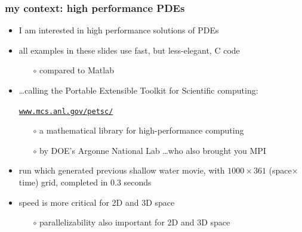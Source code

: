 \documentclass[10pt,dvipsnames,usepdftitle=false,
hyperref={pdftitle = {Finite volume methods},
    pdfauthor = {Ed Bueler}}]{beamer}
\begin{document}
\begin{frame}[fragile]

\frametitle{my context: high performance PDEs}

\begin{itemize}
\item I am interested in high performance solutions of PDEs
\item all examples in these slides use fast, but less-elegant, C code
    \begin{itemize}
    \item[$\circ$] compared to Matlab
    \end{itemize}
\item \dots calling the Portable Extensible Toolkit for Scientific computing:

    \begin{center}
    \href{https://www.mcs.anl.gov/petsc/}{\texttt{www.mcs.anl.gov/petsc/}}
    \end{center}

    \begin{itemize}
    \item[$\circ$] a mathematical library for high-performance computing
    \item[$\circ$] by DOE's Argonne National Lab \dots who also brought you MPI
    \end{itemize}
\item run which generated previous shallow water movie, with $1000\times 361$ (space$\times$time) grid, completed in 0.3 seconds

\item speed is more critical for 2D and 3D space
    \begin{itemize}
    \item[$\circ$] parallelizability also important for 2D and 3D space
    \end{itemize}
\end{itemize}
\end{frame}
\end{document}
